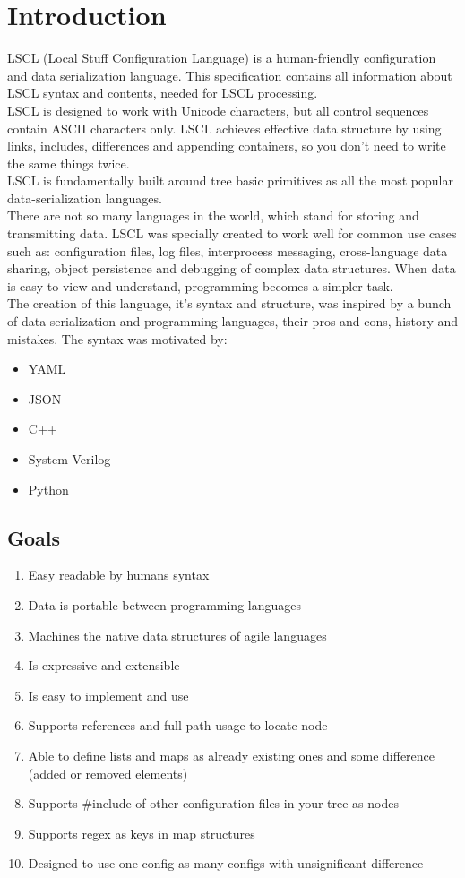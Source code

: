 \section{Introduction}
LSCL (Local Stuff Configuration Language) is a human-friendly configuration and data serialization language. This specification contains all information about LSCL syntax and contents, needed for LSCL processing. \\
LSCL is designed to work with Unicode characters, but all control sequences contain ASCII characters only. LSCL achieves effective data structure by using links, includes, differences and appending containers, so you don't need to write the same things twice. \\
LSCL is fundamentally built around tree basic primitives as all the most popular data-serialization languages. \\
There are not so many languages in the world, which stand for storing and transmitting data. LSCL was specially created to work well for common use cases such as: configuration files, log files, interprocess messaging, cross-language data sharing, object persistence and debugging of complex data structures. When data is easy to view and understand, programming becomes a simpler task. \\
The creation of this language, it's syntax and structure, was inspired by a bunch of data-serialization and programming languages, their pros and cons, history and mistakes. The syntax was motivated by:
\begin{itemize}
	\item YAML
	\item JSON
	\item C++
	\item System Verilog
	\item Python
\end{itemize}

\subsection{Goals}
\begin{enumerate}
	\item Easy readable by humans syntax
	\item Data is portable between programming languages
	\item Machines the native data structures of agile languages
	\item Is expressive and extensible
	\item Is easy to implement and use
	\item Supports references and full path usage to locate node
	\item Able to define lists and maps as already existing ones and some difference (added or removed elements)
	\item Supports {\#}include of other configuration files in your tree as nodes
	\item Supports regex as keys in map structures
	\item Designed to use one config as many configs with unsignificant difference
\end{enumerate}

